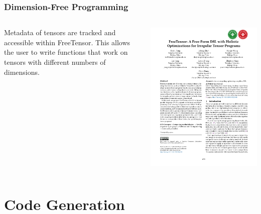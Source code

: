 \documentclass[12pt,aspectratio=169]{beamer}
\begin{document}
    \begin{frame}
        \frametitle{Dimension-Free Programming}

        \begin{columns}
            \begin{column}{0.48\textwidth}
                Metadata of tensors are tracked and accessible within FreeTensor. This allows the user to write functions
                that work on tensors with different numbers of dimensions.
            \end{column}
            \begin{column}{0.52\textwidth}
                \includegraphics[page=5,trim=11.2cm 6cm 1.9cm 14cm,clip,scale=.88]{paper.pdf}
            \end{column}
        \end{columns}
    \end{frame}



    \section{Code Generation}
\end{document}

